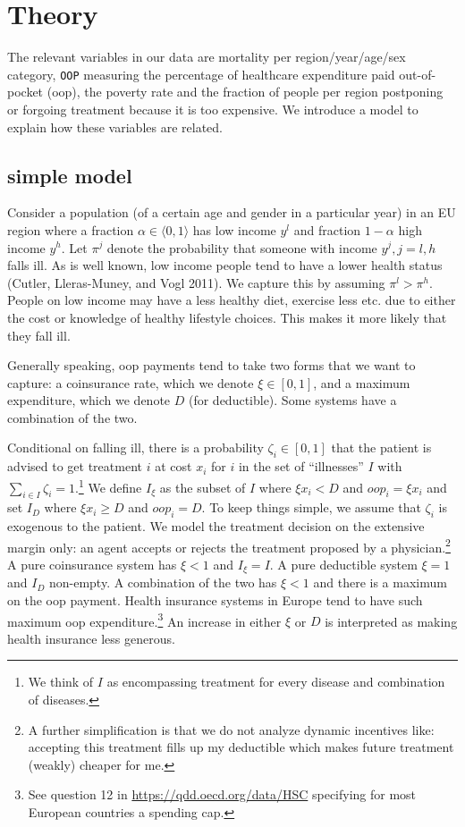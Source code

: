 \documentclass[a4paper,12pt]{article}
\makeatletter
\newcommand{\citeprocitem}[2]{\hyper@linkstart{cite}{citeproc_bib_item_#1}#2\hyper@linkend}
\makeatother
\begin{document}
\section{Theory}
\label{sec:orgf595ce4}

The relevant variables in our data are mortality per region/year/age/sex category, \texttt{OOP} measuring the percentage of healthcare expenditure paid out-of-pocket (oop), the poverty rate and the fraction of people per region postponing or forgoing treatment because it is too expensive. We introduce a model to explain how these variables are related.

\subsection{simple model}
\label{sec:org6d2b9f9}

Consider a population (of a certain age and gender in a particular year) in an EU region where a fraction \(\alpha \in \langle 0,1 \rangle\) has low income \(y^l\) and fraction \(1-\alpha\) high income \(y^h\). Let \(\pi^j\) denote the probability that someone with income \(y^j, j=l,h\) falls ill. As is well known, low income people tend to have a lower health status (\citeprocitem{11}{Cutler, Lleras-Muney, and Vogl 2011}). We capture this by assuming \(\pi^l > \pi^h\). People on low income may have a less healthy diet, exercise less etc. due to either the cost or knowledge of healthy lifestyle choices. This makes it more likely that they fall ill.

Generally speaking, oop payments tend to take two forms that we want to capture: a coinsurance rate, which we denote \(\xi \in [0,1]\), and a maximum expenditure, which we denote \(D\) (for deductible). Some systems have a combination of the two.

Conditional on falling ill, there is a probability \(\zeta_i \in [0,1]\) that the patient is advised to get treatment \(i\) at cost \(x_i\) for \(i\) in the set of ``illnesses'' \(I\) with \(\sum_{i \in I} \zeta_i =1\).\footnote{We think of \(I\) as encompassing treatment for every disease and combination of diseases.} We define \(I_{\xi}\) as the subset of \(I\) where \(\xi x_i < D\) and \(oop_i = \xi x_i\) and set \(I_D\) where \(\xi x_i \geq D\) and \(oop_i = D\). To keep things simple, we assume that \(\zeta_i\) is exogenous to the patient. We model the treatment decision on the extensive margin only: an agent accepts or rejects the treatment proposed by a physician.\footnote{A further simplification is that we do not analyze dynamic incentives like: accepting this treatment fills up my deductible which makes future treatment (weakly) cheaper for me.} A pure coinsurance system has \(\xi < 1\) and \(I_{\xi}=I\). A pure deductible system \(\xi=1\) and \(I_D\) non-empty. A combination of the two has \(\xi<1\) and there is a maximum on the oop payment. Health insurance systems in Europe tend to have such maximum oop expenditure.\footnote{See question 12 in \url{https://qdd.oecd.org/data/HSC} specifying for most European countries a spending cap.} An increase in either \(\xi\) or \(D\) is interpreted as making health insurance less generous.
\end{document}
